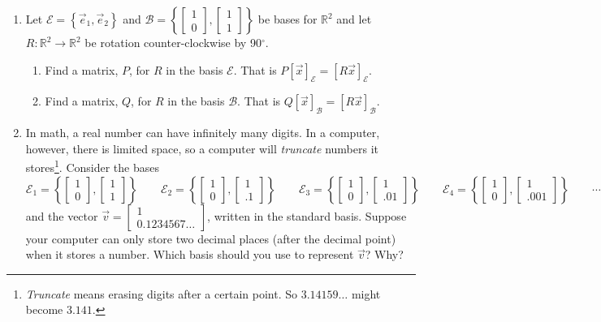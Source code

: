 \documentclass[red]{tutorial}
\newcommand{\R}{\mathbb{R}}
\newcommand{\mat}[1]{\begin{bmatrix}#1\end{bmatrix}}
\theoremstyle{definition}
\theoremstyle{theorem}
\begin{document}
\begin{tutorial}
\begin{enumerate}
\begin{enumerate}
	\end{enumerate}
\item Let $\mathcal E=\left\{\vec e_1, \vec e_2\right\}$ and $\mathcal B=\left\{\mat{1\\0},\mat{1\\1}\right\}$
		be bases for $\R^2$ and let $R:\R^2\to\R^2$ be rotation counter-clockwise by 90$^\circ$.
		\begin{enumerate}
			\item Find a matrix, $P$, for $R$ in the basis $\mathcal E$. That is $P[\vec x]_{\mathcal E} = [R\vec x]_{\mathcal E}$.
			\item Find a matrix, $Q$, for $R$ in the basis $\mathcal B$. That is $Q[\vec x]_{\mathcal B} = [R\vec x]_{\mathcal B}$.
		\end{enumerate}
	\item In math, a real number can have infinitely many digits. In a computer, however, there is limited space, so a computer
		will \emph{truncate} numbers it stores\footnote{ \emph{Truncate} means erasing digits after a certain point. So $3.14159\ldots$ might become
		$3.141$.}. Consider the bases
		\[
			\mathcal E_1=\left\{\mat{1\\0},\mat{1\\1}\right\}\qquad
			\mathcal E_2=\left\{\mat{1\\0},\mat{1\\.1}\right\}\qquad
			\mathcal E_3=\left\{\mat{1\\0},\mat{1\\.01}\right\}\qquad
			\mathcal E_4=\left\{\mat{1\\0},\mat{1\\.001}\right\}\qquad\cdots
		\]
		and the vector $\vec v=\mat{1\\0.1234567\ldots}$, written in the standard basis. Suppose your computer can only store two decimal places
		(after the decimal point) when it stores a number. Which basis should you use to represent $\vec v$? Why? 
	
\end{enumerate}
	\end{tutorial}
\end{document}
